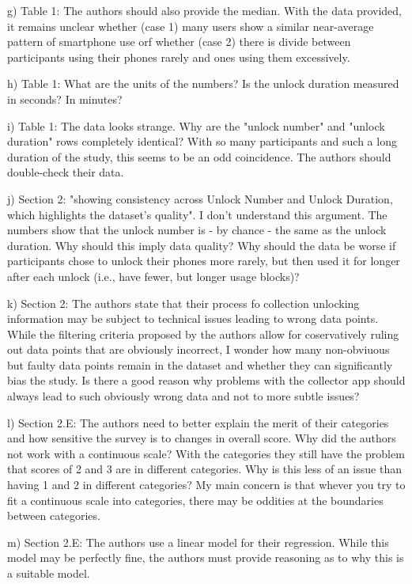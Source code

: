 g) Table 1: The authors should also provide the median. With the data provided, it remains unclear whether (case 1) many users show a similar near-average pattern of smartphone use orf whether (case 2) there is divide between participants using their phones rarely and ones using them excessively.

h) Table 1: What are the units of the numbers? Is the unlock duration measured in seconds? In minutes?

i) Table 1: The data looks strange. Why are the "unlock number" and "unlock duration" rows completely identical? With so many participants and such a long duration of the study, this seems to be an odd coincidence. The authors should double-check their data.

j) Section 2: "showing consistency across Unlock Number and Unlock Duration, which highlights the dataset’s quality". I don't understand this argument. The numbers show that the unlock number is - by chance - the same as the unlock duration. Why should this imply data quality? Why should the data be worse if participants chose to unlock their phones more rarely, but then used it for longer after each unlock (i.e., have fewer, but longer usage blocks)?

k) Section 2: The authors state that their process fo collection unlocking information may be subject to technical issues leading to wrong data points. While the filtering criteria proposed by the authors allow for coservatively ruling out data points that are obviously incorrect, I wonder how many non-obviuous but faulty data points remain in the dataset and whether they can significantly bias the study. Is there a good reason why problems with the collector app should always lead to such obviously wrong data and not to more subtle issues?

l) Section 2.E: The authors need to better explain the merit of their categories and how sensitive the survey is to changes in overall score. Why did the authors not work with a continuous scale? With the categories they still have the problem that scores of 2 and 3 are in different categories. Why is this less of an issue than having 1 and 2 in different categories? My main concern is that whever you try to fit a continuous scale into categories, there may be oddities at the boundaries between categories.

m) Section 2.E: The authors use a linear model for their regression. While this model may be perfectly fine, the authors must provide reasoning as to why this is a suitable model.

